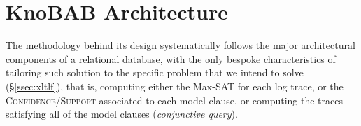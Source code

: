 \section{KnoBAB Architecture}\label{sec:karch}
The methodology behind its design systematically follows the major architectural components of a relational database, with the only bespoke characteristics of tailoring such solution to the specific problem that we intend to solve (\S\ref{ssec:xltlf}), that is, computing either the Max-SAT for each log trace,  or the \textsc{Confidence}/\textsc{Support} associated to each model clause, or computing the traces satisfying all of the model clauses (\textit{conjunctive query}).

